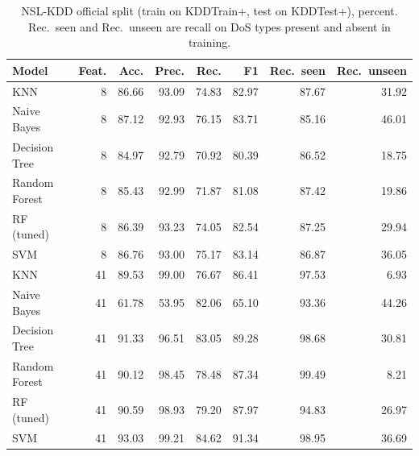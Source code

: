 \begin{table}[t]
\centering
\caption{NSL-KDD official split (train on KDDTrain+, test on KDDTest+), percent. Rec.\ seen and Rec.\ unseen are recall on DoS types present and absent in training.}
\label{tab:official}
\footnotesize
\setlength{\tabcolsep}{2.5pt}
\begin{tabular}{lrrrrrrr}
\toprule
Model & Feat. & Acc. & Prec. & Rec. & F1 & Rec.\ seen & Rec.\ unseen \\
\midrule
KNN & 8 & 86.66 & 93.09 & 74.83 & 82.97 & 87.67 & 31.92 \\
Naive Bayes & 8 & 87.12 & 92.93 & 76.15 & 83.71 & 85.16 & 46.01 \\
Decision Tree & 8 & 84.97 & 92.79 & 70.92 & 80.39 & 86.52 & 18.75 \\
Random Forest & 8 & 85.43 & 92.99 & 71.87 & 81.08 & 87.42 & 19.86 \\
RF (tuned) & 8 & 86.39 & 93.23 & 74.05 & 82.54 & 87.25 & 29.94 \\
SVM & 8 & 86.76 & 93.00 & 75.17 & 83.14 & 86.87 & 36.05 \\
\midrule
KNN & 41 & 89.53 & 99.00 & 76.67 & 86.41 & 97.53 & 6.93 \\
Naive Bayes & 41 & 61.78 & 53.95 & 82.06 & 65.10 & 93.36 & 44.26 \\
Decision Tree & 41 & 91.33 & 96.51 & 83.05 & 89.28 & 98.68 & 30.81 \\
Random Forest & 41 & 90.12 & 98.45 & 78.48 & 87.34 & 99.49 & 8.21 \\
RF (tuned) & 41 & 90.59 & 98.93 & 79.20 & 87.97 & 94.83 & 26.97 \\
SVM & 41 & 93.03 & 99.21 & 84.62 & 91.34 & 98.95 & 36.69 \\
\bottomrule
\end{tabular}
\end{table}
